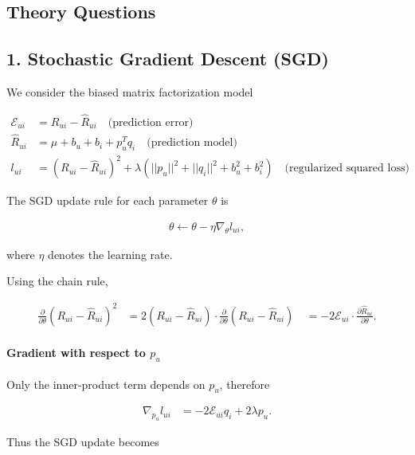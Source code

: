 \documentclass[11pt]{article}
\begin{document}
\begin{appendices}
\section{Theory Questions}
\label{app:theory}

\subsection*{1. Stochastic Gradient Descent (SGD)}

We consider the biased matrix factorization model

\begin{align*}
    \mathcal{E}_{ui} &= R_{ui} - \hat{R}_{ui}
    \quad \text{(prediction error)} \\
    \hat{R}_{ui} &= \mu + b_u + b_i + p_u^T q_i
    \quad \text{(prediction model)} \\
    l_{ui} &= (R_{ui} - \hat{R}_{ui})^2
    + \lambda (||p_u||^2 + ||q_i||^2 + b_u^2 + b_i^2)
    \quad \text{(regularized squared loss)}
\end{align*}

The SGD update rule for each parameter $\theta$ is

\begin{align*}
    \theta \leftarrow \theta - \eta \nabla_{\theta}l_{ui},
\end{align*}

where $\eta$ denotes the learning rate.

Using the chain rule,

\begin{align*}
    \frac{\partial}{\partial\theta}(R_{ui} - \hat{R}_{ui})^2
    &= 2(R_{ui} - \hat{R}_{ui})
    \cdot
    \frac{\partial}{\partial\theta}(R_{ui} - \hat{R}_{ui}) \
    &= -2 \mathcal{E}_{ui}
    \cdot
    \frac{\partial\hat{R}_{ui}}{\partial\theta}.
\end{align*}

\paragraph{Gradient with respect to $p_u$}

Only the inner-product term depends on $p_u$, therefore

\begin{align*}
    \nabla_{p_u} l_{ui}
    &= -2\mathcal{E}_{ui} q_i + 2\lambda p_u.
\end{align*}

Thus the SGD update becomes


\end{appendices}
\end{document}
